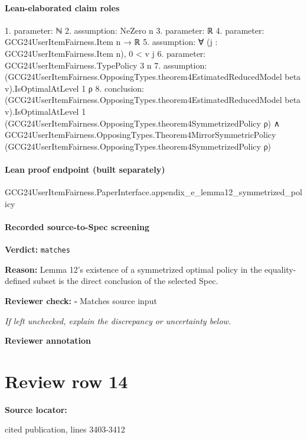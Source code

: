 \documentclass[10pt]{article}
\newcommand{\reviewerbox}{%
  \par\noindent\fbox{\parbox{0.96\linewidth}{\rule{0pt}{0.38in}}}\par
}
\newcommand{\reviewmatch}[1]{%
  \par\noindent\textbf{Reviewer check:} $\square$\; #1\par
  \noindent\emph{If left unchecked, explain the discrepancy or uncertainty below.}\par
}
\begin{document}
\paragraph{Lean-elaborated claim roles}\begin{ReviewVerbatim}
1. parameter: ℕ
2. assumption: NeZero n
3. parameter: ℝ
4. parameter: GCG24UserItemFairness.Item n → ℝ
5. assumption: ∀ (j : GCG24UserItemFairness.Item n), 0 < v j
6. parameter: GCG24UserItemFairness.TypePolicy 3 n
7. assumption: (GCG24UserItemFairness.OpposingTypes.theorem4EstimatedReducedModel beta v).IsOptimalAtLevel 1 ρ
8. conclusion: (GCG24UserItemFairness.OpposingTypes.theorem4EstimatedReducedModel beta v).IsOptimalAtLevel 1
    (GCG24UserItemFairness.OpposingTypes.theorem4SymmetrizedPolicy ρ) ∧
  GCG24UserItemFairness.OpposingTypes.Theorem4MirrorSymmetricPolicy
    (GCG24UserItemFairness.OpposingTypes.theorem4SymmetrizedPolicy ρ)
\end{ReviewVerbatim}

\paragraph{Lean proof endpoint (built separately)}\begin{ReviewVerbatim}
GCG24UserItemFairness.PaperInterface.appendix_e_lemma12_symmetrized_policy
\end{ReviewVerbatim}

\paragraph{Recorded source-to-Spec screening}
\textbf{Verdict:} \texttt{matches}
\\
{\raggedright
\textbf{Reason:} Lemma 12's existence of a symmetrized optimal policy in the equality-\allowbreak{}defined subset is the direct conclusion of the selected Spec.\allowbreak{}
\par}
\reviewmatch{Matches source input}
\noindent\textbf{Reviewer annotation}\par
\reviewerbox
\clearpage
\hypertarget{source-claim-090419aeb8d7a8b0}{}
\section*{Review row 14}
\textbf{Source locator:} {\footnotesize\raggedright cited publication, lines 3403-\allowbreak{}3412\par}
\end{document}
